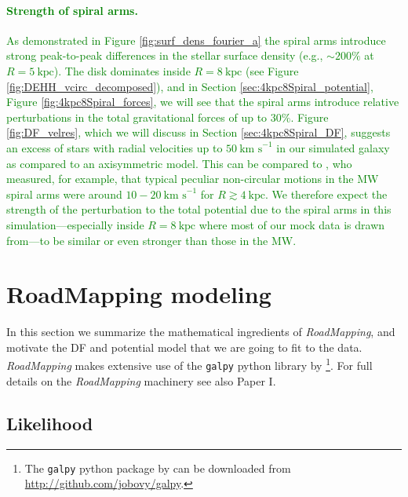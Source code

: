 \documentclass[iop,revtex4,numberedappendix,appendixfloats]{emulateapj}
\newcommand{\RM}{{\sl RoadMapping}}
\newcommand{\NEW}[1]{\textcolor{Green}{#1}}
\begin{document}
\NEW{\paragraph{Strength of spiral arms.} As demonstrated in Figure \ref{fig:surf_dens_fourier_a} the spiral arms introduce strong peak-to-peak differences in the stellar surface density (e.g., $\sim200\%$  at $R=5~\text{kpc}$). The disk dominates inside $R=8~\text{kpc}$ (see Figure \ref{fig:DEHH_vcirc_decomposed}), and in Section \ref{sec:4kpc8Spiral_potential}, Figure \ref{fig:4kpc8Spiral_forces}, we will see that the spiral arms introduce relative perturbations in the total gravitational forces of up to $30\%$. Figure \ref{fig:DF_velres}, which we will discuss in Section \ref{sec:4kpc8Spiral_DF}, suggests an excess of stars with radial velocities up to $50~\text{km s}^{-1}$ in our simulated galaxy as compared to an axisymmetric model. This can be compared to \citet{2014ApJ...783..130R}, who measured, for example, that typical peculiar non-circular motions in the MW spiral arms were around $10-20~\text{km s}^{-1}$ for $R \gtrsim 4~\text{kpc}$. We therefore expect the strength of the perturbation to the total potential due to the spiral arms in this simulation---especially inside $R=8~\text{kpc}$ where most of our mock data is drawn from---to be similar or even stronger than those in the MW.}

\section{RoadMapping modeling} \label{sec:RoadMapping}

In this section we summarize the mathematical ingredients of \RM{}, and motivate the DF and potential model that we are going to fit to the data. \RM{} makes extensive use of the \texttt{galpy} python library by \citet{2015ApJS..216...29B}\footnote{The \texttt{galpy} python package by \citet{2015ApJS..216...29B} can be downloaded from \url{http://github.com/jobovy/galpy}.}. For full details on the \RM{} machinery see also Paper I.

\subsection{Likelihood} \label{sec:likelihood}
\end{document}
